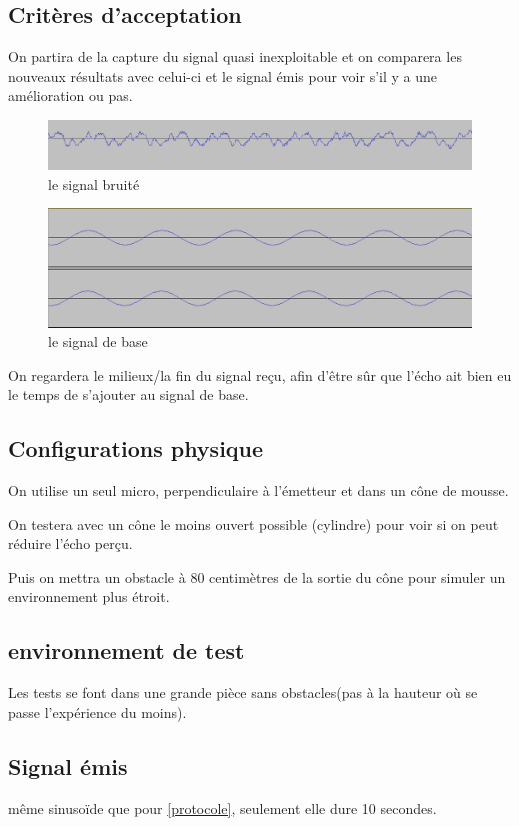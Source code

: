 \documentclass[12pt,a4paper]{report}
\begin{document}
\subsection{Critères d'acceptation}
On partira de la capture du signal quasi inexploitable et on comparera les nouveaux résultats avec celui-ci et le signal émis pour voir s'il y a une amélioration ou pas.
\begin{figure}[H]
\includegraphics[width=\textwidth]{img/cone_90.png}
\caption{le signal bruité}
\end{figure}
\begin{figure}[H]
\includegraphics[width=\textwidth]{img/sinus_base.png}
\caption{le signal de base}
\end{figure}
On regardera le milieux/la fin du signal reçu, afin d'être sûr que l'écho ait bien eu le temps de s'ajouter au signal de base.


\subsection{Configurations physique}
On utilise un seul micro, perpendiculaire à l'émetteur et dans un cône de mousse.

On testera avec un cône le moins ouvert possible (cylindre) pour voir si on peut réduire l'écho perçu.

Puis on mettra un obstacle à 80 centimètres de la sortie du cône pour simuler un environnement plus étroit.

\subsection{environnement de test}
Les tests se font dans une grande pièce sans obstacles(pas à la hauteur où se passe l'expérience du moins).

\subsection{Signal émis}
même sinusoïde que pour \ref{protocole}, seulement elle dure 10 secondes.
\end{document}
